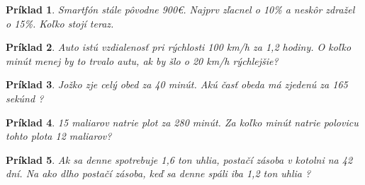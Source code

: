 \documentclass{article}
\newtheorem{example}{Príklad}
\begin{document}
	\begin{example}
		Smartfón stále pôvodne 900€. Najprv zľacnel o 10\% a neskôr zdražel o 15\%. Koľko stojí teraz.
	\end{example}
	
	\begin{example}
		Auto istú vzdialenosť pri rýchlosti 100 km/h za 1,2 hodiny. O koľko minút menej by to trvalo autu, ak by šlo o 20 km/h rýchlejšie? 
	\end{example}
	
	\begin{example}
		Jožko zje celý obed za 40 minút. Akú časť obeda má zjedenú za 165 sekúnd ?
	\end{example}
	
	\begin{example}
		15 maliarov natrie plot za 280 minút. Za koľko minút natrie polovicu tohto plota 12 maliarov?
	\end{example}
	
	\begin{example}
		Ak sa denne spotrebuje 1,6 ton uhlia, postačí zásoba v kotolni na 42 dní. Na ako dlho postačí zásoba, keď sa denne spáli iba 1,2 ton uhlia ?
	\end{example}
	
	
\end{document}
